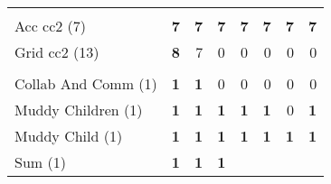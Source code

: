 \begin{tabular}{lrrccrrr}
    & \multicolumn{7}{l}{\emph{\textcite{ghosh-et-al-jar2015}}} \\
    Acc cc2 (7)                    & \textbf{7}                               & \textbf{7}
                                            & \textbf{7}                               &
    \textbf{7}
                                            & \textbf{7}                               & \textbf{7}
                                            & \textbf{7}                                                                                                                                \\
    Grid cc2 (13)                  & \textbf{8}                               & 7
                                            & 0                                        & 0
                                            & 0                                        & 0                                      & 0                                                     \\
    \midrule
    & \multicolumn{7}{l}{\emph{\textcite{kominis-geffner-icaps2015}}} \\
    Collab And Comm (1)            & \textbf{1}                               &
    \textbf{1}                              & 0                                        & 0
                                            & 0                                        & 0                                      & 0                                                     \\
    Muddy Children (1)             & \textbf{1}                               &
    \textbf{1}                              & \textbf{1}                               & \textbf{1}                             & \textbf{1}                              & 0
                                            & \textbf{1}                                                                                                                                \\
    Muddy Child (1)                & \textbf{1}                               &
    \textbf{1}                              & \textbf{1}                               &
    \textbf{1}                              & \textbf{1}                               &
    \textbf{1}                              & \textbf{1}                                                                                                                                \\
    Sum (1)                        & \textbf{1}                               &
    \textbf{1}                              & \textbf{1}                               &

\end{tabular}
